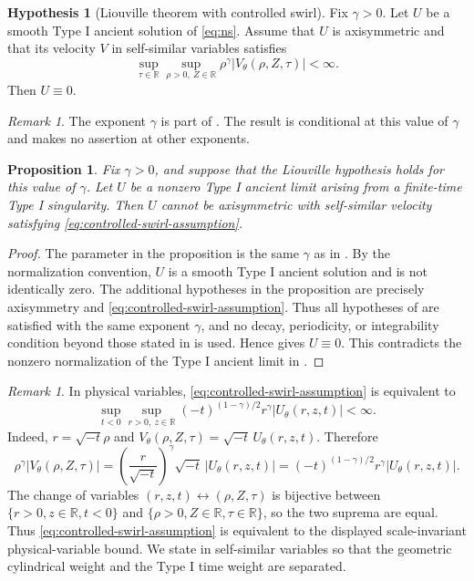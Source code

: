 \documentclass[11pt]{amsart}
\theoremstyle{plain}
\newtheorem{proposition}[theorem]{Proposition}
\theoremstyle{definition}
\newtheorem{hypothesis}[theorem]{Hypothesis}
\theoremstyle{remark}
\newtheorem{remark}[theorem]{Remark}
\numberwithin{equation}{section}
\begin{document}
\begin{hypothesis}[Liouville theorem with controlled swirl]\label{hyp:swirl}
Fix \(\gamma>0\).  Let \(U\) be a smooth Type I ancient solution of
\eqref{eq:ns}.  Assume that \(U\) is axisymmetric and that its velocity \(V\) in
self-similar variables satisfies
\begin{equation}\label{eq:controlled-swirl-assumption}
\sup_{\tau\in\mathbb R}\sup_{\rho>0,\ Z\in\mathbb R}
\rho^\gamma |V_\theta(\rho,Z,\tau)|<\infty.
\end{equation}
Then \(U\equiv0\).
\end{hypothesis}

\begin{remark}\label{rem:swirl-exponent}
The exponent \(\gamma\) is part of .  The result is conditional
at this value of \(\gamma\) and makes no assertion at other exponents.
\end{remark}

\begin{proposition}\label{prop:swirl-exclusion}
Fix \(\gamma>0\), and suppose that the Liouville hypothesis
 holds for this value of \(\gamma\).  Let \(U\) be a nonzero
Type I ancient limit arising from a finite-time Type I singularity.  Then \(U\)
cannot be axisymmetric with self-similar velocity satisfying
\eqref{eq:controlled-swirl-assumption}.
\end{proposition}

\begin{proof}
The parameter in the proposition is the same \(\gamma\) as in
.  By the normalization convention, \(U\) is a smooth Type I
ancient solution and is not identically zero.  The additional
hypotheses in the proposition are precisely axisymmetry and
\eqref{eq:controlled-swirl-assumption}.  Thus all hypotheses of
 are satisfied with the same exponent \(\gamma\), and no
decay, periodicity, or integrability condition beyond those stated in
 is used.  Hence
 gives \(U\equiv0\).  This contradicts the nonzero
normalization of the Type I ancient limit in
.
\end{proof}

\begin{remark}\label{rem:swirl-scale}
In physical variables, \eqref{eq:controlled-swirl-assumption} is equivalent to
\[
\sup_{t<0}\sup_{r>0,\ z\in\mathbb R}
(-t)^{(1-\gamma)/2}r^\gamma |U_\theta(r,z,t)|<\infty .
\]
Indeed, \(r=\sqrt{-t}\rho\) and
\(V_\theta(\rho,Z,\tau)=\sqrt{-t}\,U_\theta(r,z,t)\).  Therefore
\[
   \rho^\gamma |V_\theta(\rho,Z,\tau)|
   =
   \left(\frac{r}{\sqrt{-t}}\right)^\gamma
   \sqrt{-t}\,|U_\theta(r,z,t)|
   =
   (-t)^{(1-\gamma)/2}r^\gamma |U_\theta(r,z,t)|.
\]
The change of variables \((r,z,t)\leftrightarrow(\rho,Z,\tau)\) is bijective
between \(\{r>0,z\in\mathbb R,t<0\}\) and
\(\{\rho>0,Z\in\mathbb R,\tau\in\mathbb R\}\), so the two suprema are equal.
Thus \eqref{eq:controlled-swirl-assumption} is equivalent to the displayed
scale-invariant physical-variable bound.  We state  in
self-similar variables so that the geometric cylindrical weight and the Type I
time weight are separated.
\end{remark}
\end{document}
